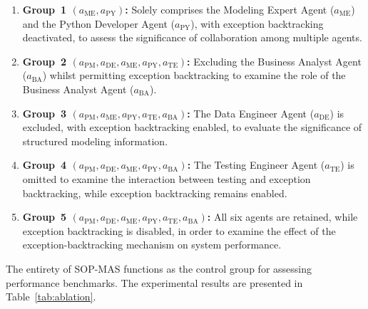 \documentclass[preprint,12pt]{elsarticle}
\begin{document}
\begin{enumerate}[label=\arabic*)]
 \item \textbf{Group~1 $(a_\text{ME}, a_\text{PY})$:} Solely comprises the Modeling Expert Agent ($a_{\text{ME}}$) and the Python Developer Agent ($a_{\text{PY}}$), with exception backtracking deactivated, to assess the significance of collaboration among multiple agents.

 \item \textbf{Group~2 $(a_\text{PM}, a_\text{DE}, a_\text{ME}, a_\text{PY}, a_\text{TE})$:} Excluding the Business Analyst Agent ($a_{\text{BA}}$) whilst permitting exception backtracking to examine the role of the Business Analyst Agent ($a_{\text{BA}}$).

 \item \textbf{Group~3 $(a_\text{PM}, a_\text{ME}, a_\text{PY}, a_\text{TE}, a_\text{BA})$:} The Data Engineer Agent ($a_{\text{DE}}$) is excluded, with exception backtracking enabled, to evaluate the significance of structured modeling information.

 \item \textbf{Group~4 $(a_\text{PM}, a_\text{DE}, a_\text{ME}, a_\text{PY}, a_\text{BA})$:} The Testing Engineer Agent ($a_{\text{TE}}$) is omitted to examine the interaction between testing and exception backtracking, while exception backtracking remains enabled.

 \item \textbf{Group~5 $(a_\text{PM}, a_\text{DE}, a_\text{ME}, a_\text{PY}, a_\text{TE}, a_\text{BA})$:} All six agents are retained, while exception backtracking is disabled, in order to examine the effect of the exception-backtracking mechanism on system performance.
\end{enumerate}
The entirety of SOP-MAS functions as the control group for assessing performance benchmarks. The experimental results are presented in Table~\ref{tab:ablation}.
\end{document}
